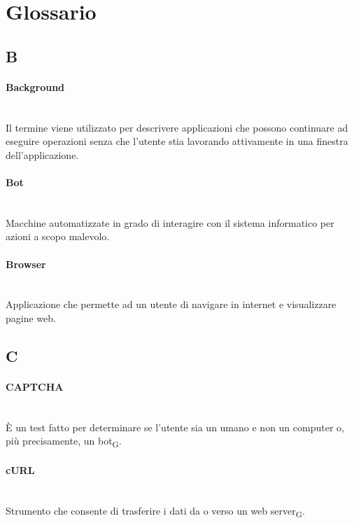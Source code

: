 \section{Glossario}
\subsection*{B}

\paragraph{Background}~\smallskip \\
Il termine viene utilizzato per descrivere applicazioni che possono continuare ad eseguire operazioni senza che l'utente stia lavorando attivamente in una finestra dell'applicazione.

\paragraph{Bot}~\smallskip \\
Macchine automatizzate in grado di interagire con il sistema informatico per azioni a scopo malevolo.

\paragraph{Browser}~\smallskip \\
Applicazione che permette ad un utente di navigare in internet e visualizzare pagine web.

\newpage
{}
\subsection*{C}

\paragraph{CAPTCHA}~\smallskip \\
È un test fatto per determinare se l'utente sia un umano e non un computer o, più precisamente, un bot\textsubscript{G}.

\paragraph{cURL}~\smallskip \\
Strumento che consente di trasferire i dati da o verso un web server\textsubscript{G}.

